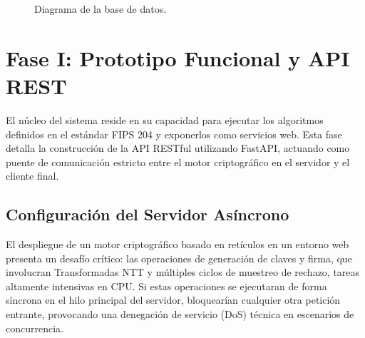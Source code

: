 \documentclass[11pt, a4paper]{report}
\theoremstyle{definition}
\begin{document}
\begin{figure}[H]
    \caption{Diagrama de la base de datos.}
    \label{fig:diagrama_relacional}
\end{figure}


\section{Fase I: Prototipo Funcional y API REST}
\label{sec:fase1_api}

El núcleo del sistema reside en su capacidad para ejecutar los algoritmos definidos en el estándar FIPS 204 y exponerlos como servicios web. Esta fase detalla la construcción de la API RESTful utilizando FastAPI, actuando como puente de comunicación estricto entre el motor criptográfico en el servidor y el cliente final.

\subsection{Configuración del Servidor Asíncrono}
\label{subsec:configuracion_servidor}

El despliegue de un motor criptográfico basado en retículos en un entorno web presenta un desafío crítico: las operaciones de generación de claves y firma, que involucran Transformadas NTT y múltiples ciclos de muestreo de rechazo, tareas altamente intensivas en CPU. Si estas operaciones se ejecutaran de forma síncrona en el hilo principal del servidor, bloquearían cualquier otra petición entrante, provocando una denegación de servicio (DoS) técnica en escenarios de concurrencia.
\end{document}
